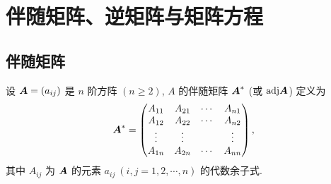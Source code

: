 \section{伴随矩阵、逆矩阵与矩阵方程}

\subsection{伴随矩阵}

\begin{definition}[伴随矩阵的定义]
    设 $ \vb*{A}=\left(a_{i j}\right) $ 是 $ n $ 阶方阵 $ (n \geqslant 2)$, $A $ 的伴随矩阵 $\vb*{A}^*$ (或 $\mathrm{adj}\vb*{A}$) 定义为
    $$\vb*{A}^{*}=\begin{pmatrix}
            A_{11}  & A_{21}  & \cdots & A_{n 1} \\
            A_{12}  & A_{22}  & \cdots & A_{n 2} \\
            \vdots  & \vdots  &        & \vdots  \\
            A_{1 n} & A_{2 n} & \cdots & A_{n n}
        \end{pmatrix},$$
    其中 $ A_{i j} $ 为 $ \vb*{A} $ 的元素 $ a_{i j}~ (i, j=1,2, \cdots, n) $ 的代数余子式.
\end{definition}

